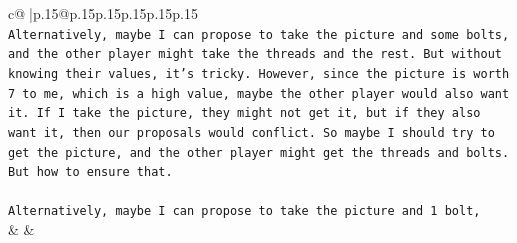 \documentclass{article}
\begin{document}
{\begin{supertabular}{c@{$\;$}|p{.15\linewidth}@{}p{.15\linewidth}p{.15\linewidth}p{.15\linewidth}p{.15\linewidth}p{.15\linewidth}}
{{{\\ 
\texttt{Alternatively, maybe I can propose to take the picture and some bolts, and the other player might take the threads and the rest. But without knowing their values, it's tricky. However, since the picture is worth 7 to me, which is a high value, maybe the other player would also want it. If I take the picture, they might not get it, but if they also want it, then our proposals would conflict. So maybe I should try to get the picture, and the other player might get the threads and bolts. But how to ensure that.} \\
\\ 
\texttt{Alternatively, maybe I can propose to take the picture and 1 bolt,} \\
            }
        }
    }
    & & \\ \\


\end{supertabular}}
\end{document}
